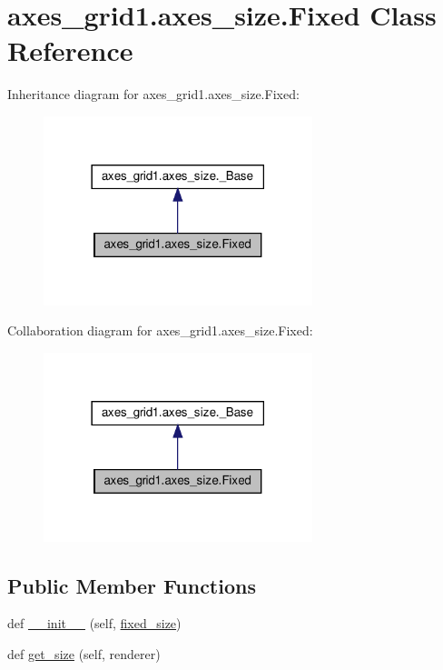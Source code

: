 \hypertarget{classaxes__grid1_1_1axes__size_1_1Fixed}{}\section{axes\+\_\+grid1.\+axes\+\_\+size.\+Fixed Class Reference}
\label{classaxes__grid1_1_1axes__size_1_1Fixed}


Inheritance diagram for axes\+\_\+grid1.\+axes\+\_\+size.\+Fixed\+:
\nopagebreak
\begin{figure}[H]
\begin{center}
\leavevmode
\includegraphics[width=222pt]{classaxes__grid1_1_1axes__size_1_1Fixed__inherit__graph}
\end{center}
\end{figure}


Collaboration diagram for axes\+\_\+grid1.\+axes\+\_\+size.\+Fixed\+:
\nopagebreak
\begin{figure}[H]
\begin{center}
\leavevmode
\includegraphics[width=222pt]{classaxes__grid1_1_1axes__size_1_1Fixed__coll__graph}
\end{center}
\end{figure}
\subsection*{Public Member Functions}
\begin{DoxyCompactItemize}
\item 
def \hyperlink{classaxes__grid1_1_1axes__size_1_1Fixed_a6cff5ffe86427197f5033c7b346a2341}{\+\_\+\+\_\+init\+\_\+\+\_\+} (self, \hyperlink{classaxes__grid1_1_1axes__size_1_1Fixed_a0f388282ddd82776e183d054fc310708}{fixed\+\_\+size})
\item 
def \hyperlink{classaxes__grid1_1_1axes__size_1_1Fixed_a1743e221aff9893afa8adf8f0214865d}{get\+\_\+size} (self, renderer)
\end{DoxyCompactItemize}
